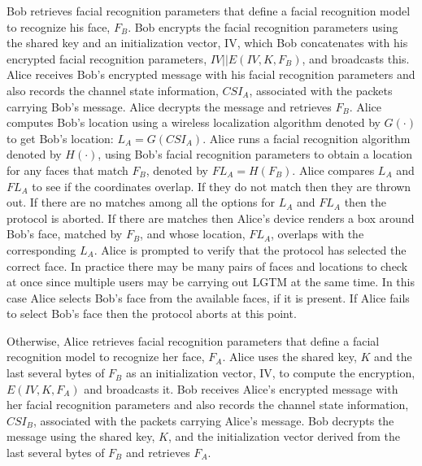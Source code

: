 \documentclass[12pt]{report}
\begin{document}
Bob retrieves facial recognition parameters that define a facial recognition model to recognize his face, $F_{B}$. Bob encrypts the facial recognition parameters using the shared key and an initialization vector, IV, which Bob concatenates with his encrypted facial recognition parameters, $IV || E(IV, K, F_{B})$, and broadcasts this. Alice receives Bob's encrypted message with his facial recognition parameters and also records the channel state information, $CSI_{A}$, associated with the packets carrying Bob's message. Alice decrypts the message and retrieves $F_{B}$. Alice computes Bob's location using a wireless localization algorithm denoted by $G(\cdot)$ to get Bob's location: $L_{A} = G(CSI_{A})$. Alice runs a facial recognition algorithm denoted by $H(\cdot)$, using Bob's facial recognition parameters to obtain a location for any faces that match $F_{B}$, denoted by $FL_{A} = H(F_{B})$. Alice compares $L_{A}$ and $FL_{A}$ to see if the coordinates overlap. If they do not match then they are thrown out. If there are no matches among all the options for $L_{A}$ and $FL_{A}$ then the protocol is aborted. If there are matches then Alice's device renders a box around Bob's face, matched by $F_{B}$, and whose location, $FL_{A}$, overlaps with the corresponding $L_{A}$. Alice is prompted to verify that the protocol has selected the correct face. In practice there may be many pairs of faces and locations to check at once since multiple users may be carrying out LGTM at the same time. In this case Alice selects Bob's face from the available faces, if it is present. If Alice fails to select Bob's face then the protocol aborts at this point. \par

Otherwise, Alice retrieves facial recognition parameters that define a facial recognition model to recognize her face, $F_{A}$. Alice uses the shared key, $K$ and the last several bytes of $F_{B}$ as an initialization vector, IV, to compute the encryption, $E(IV, K, F_{A})$ and broadcasts it. Bob receives Alice's encrypted message with her facial recognition parameters and also records the channel state information, $CSI_{B}$, associated with the packets carrying Alice's message. Bob decrypts the message using the shared key, $K$, and the initialization vector derived from the last several bytes of $F_{B}$ and retrieves $F_{A}$. \par
\end{document}
